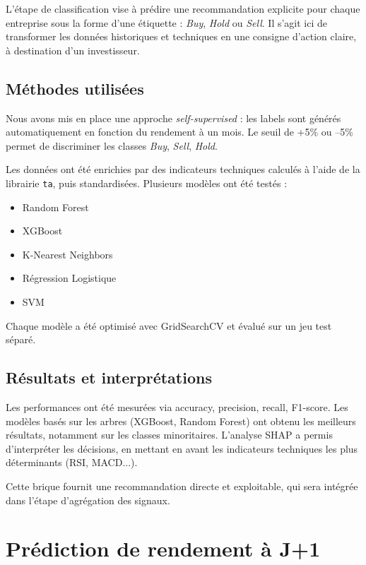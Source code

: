 \documentclass[a4paper,12pt]{article}
\begin{document}
L’étape de classification vise à prédire une recommandation explicite pour chaque entreprise sous la forme d’une étiquette : \textit{Buy}, \textit{Hold} ou \textit{Sell}. Il s’agit ici de transformer les données historiques et techniques en une consigne d’action claire, à destination d’un investisseur.

\subsection*{Méthodes utilisées}

Nous avons mis en place une approche \textit{self-supervised} : les labels sont générés automatiquement en fonction du rendement à un mois. Le seuil de +5\% ou –5\% permet de discriminer les classes \textit{Buy}, \textit{Sell}, \textit{Hold}.

Les données ont été enrichies par des indicateurs techniques calculés à l’aide de la librairie \texttt{ta}, puis standardisées. Plusieurs modèles ont été testés :

\begin{itemize}
  \item Random Forest
  \item XGBoost
  \item K-Nearest Neighbors
  \item Régression Logistique
  \item SVM
\end{itemize}

Chaque modèle a été optimisé avec GridSearchCV et évalué sur un jeu test séparé.

\subsection*{Résultats et interprétations}

Les performances ont été mesurées via accuracy, precision, recall, F1-score. Les modèles basés sur les arbres (XGBoost, Random Forest) ont obtenu les meilleurs résultats, notamment sur les classes minoritaires. L’analyse SHAP a permis d’interpréter les décisions, en mettant en avant les indicateurs techniques les plus déterminants (RSI, MACD...).

Cette brique fournit une recommandation directe et exploitable, qui sera intégrée dans l’étape d’agrégation des signaux.

\section{Prédiction de rendement à J+1}
\end{document}
